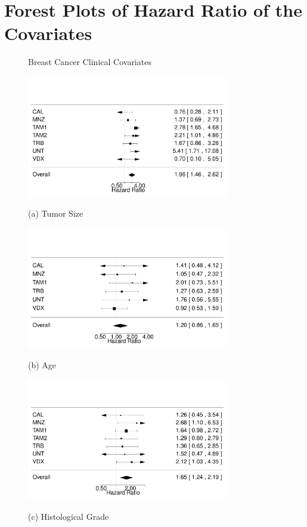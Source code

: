 \documentclass{article}
\begin{document}
\newpage
\section{Forest Plots of Hazard Ratio of the Covariates}
\begin{figure}[H]
      \centering
      \centerline{Breast Cancer Clinical Covariates}
        \begin{minipage}[b]{0.5\textwidth}
            \includegraphics[width=8.8cm]{forest_size.pdf}
            \centerline{(a) Tumor Size}
        \end{minipage}%
        \begin{minipage}[b]{0.5\textwidth}
            \includegraphics[width=8.8cm]{forest_age.pdf}
             \centerline{(b) Age}
        \end{minipage}
        \begin{minipage}[b]{0.5\textwidth}
            \includegraphics[width=8.8cm]{forest_grade.pdf}
            \centerline{(c) Histological Grade}
        \end{minipage}
    \label{forest-plots}
  \end{figure}
  
\end{document}
